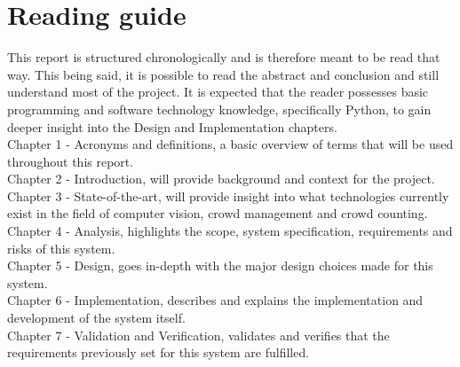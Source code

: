 \documentclass[
]{article}
\renewcommand*\contentsname{Table of contents}
\newcommand\contentsname{Table of contents}
\begin{document}
\newpage 


\ifdefined\Shaded\renewenvironment{Shaded}{\begin{tcolorbox}[interior hidden, breakable, borderline west={3pt}{0pt}{shadecolor}, frame hidden, enhanced, boxrule=0pt, sharp corners]}{\end{tcolorbox}}\fi

\renewcommand*\contentsname{Table of contents}
{
\hypersetup{linkcolor=}
\setcounter{tocdepth}{3}
\tableofcontents
}
\newpage{}

\hypertarget{reading-guide}{%
\section*{Reading guide}\label{reading-guide}}

This report is structured chronologically and is therefore meant to be
read that way. This being said, it is possible to read the abstract and
conclusion and still understand most of the project. It is expected that
the reader possesses basic programming and software technology
knowledge, specifically Python, to gain deeper insight into the Design
and Implementation chapters.~\\

Chapter 1 - Acronyms and definitions, a basic overview of terms that
will be used throughout this report. ~\\

Chapter 2 - Introduction, will provide background and context for the
project. ~\\

Chapter 3 - State-of-the-art, will provide insight into what
technologies currently exist in the field of computer vision, crowd
management and crowd counting. ~\\

Chapter 4 - Analysis, highlights the scope, system specification,
requirements and risks of this system. ~\\

Chapter 5 - Design, goes in-depth with the major design choices made for
this system. ~\\

Chapter 6 - Implementation, describes and explains the implementation
and development of the system itself. ~\\

Chapter 7 - Validation and Verification, validates and verifies that the
requirements previously set for this system are fulfilled. ~\\
\end{document}
